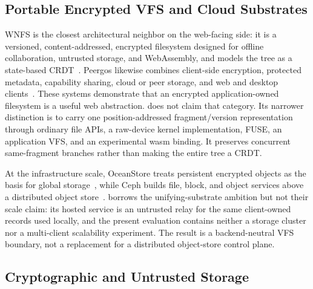 \subsection{Portable Encrypted VFS and Cloud Substrates}
\label{subsec:rw-vfs}

WNFS is the closest architectural neighbor on the web-facing side: it is a
versioned, content-addressed, encrypted filesystem designed for offline
collaboration, untrusted storage, and WebAssembly, and models the tree as a
state-based CRDT~\citep{WNFSspec}.  Peergos likewise combines client-side
encryption, protected metadata, capability sharing, cloud or peer storage, and
web and desktop clients~\citep{Peergos}.  These systems demonstrate that an
encrypted application-owned filesystem is a useful web abstraction.  \sfs{}
does not claim that category.  Its narrower distinction is to carry one
position-addressed fragment/version representation through ordinary file APIs,
a raw-device kernel implementation, FUSE, an application VFS, and an
experimental wasm binding.  It preserves concurrent same-fragment branches
rather than making the entire tree a CRDT.

At the infrastructure scale, OceanStore treats persistent encrypted objects as
the basis for global storage~\citep{Kubiatowicz2000OceanStore}, while Ceph
builds file, block, and object services above a distributed object
store~\citep{Weil2006Ceph}.  \sfs{} borrows the unifying-substrate ambition but
not their scale claim: its hosted service is an untrusted relay for the same
client-owned records used locally, and the present evaluation contains neither
a storage cluster nor a multi-client scalability experiment.  The result is a
backend-neutral VFS boundary, not a replacement for a distributed object-store
control plane.

\subsection{Cryptographic and Untrusted Storage}
\label{subsec:rw-crypto}

